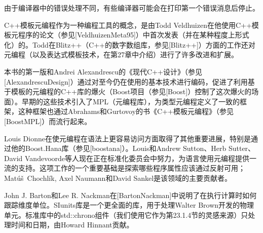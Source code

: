 \begin{notice}
由于编译器中的错误处理不同，有些编译器可能会在打印第一个错误消息后停止。
\end{notice}

C++模板元编程作为一种编程工具的概念，是由Todd Veldhuizen在他使用C++模板元程序的论文（参见[VeldhuizenMeta95]）中首次发表（并在某种程度上形式化）的。Todd在Blitz++（C++的数字数组库，参见[Blitz++]）方面的工作还对元编程（以及表达式模板技术，在第27章中介绍）进行了许多改进和扩展。

本书的第一版和Andrei Alexandrescu的《现代C++设计》（参见[AlexandrescuDesign]）通过对至今仍在使用的基本技术进行编码，促进了利用基于模板的元编程的C++库的爆火（Boost项目（参见[Boost]）控制了这次爆火的场面）。早期的这些技术引入了MPL（元编程库），为类型元编程定义了一致的框架，这种框架也通过Abrahams和Gurtovoy的书《C++模板元编程》（参见[BoostMPL]）而流行起来。

Louis Dionne在使元编程在语法上更容易访问方面取得了其他重要进展，特别是通过他的Boost.Hana库（参见[boostana]）。Louis和Andrew Sutton、Herb Sutter、David Vandevoorde等人现在正在标准化委员会中努力，为语言使用元编程提供一流的支持。这项工作的一个重要基础是探索哪些程序属性应该通过反射可用；Mat\'{u}\v{s}\ Chochl\'{i}k, Axel Naumann和David Sankel是该领域的主要贡献者。

John J. Barton和Lee R. Nackman在[BartonNackman]中说明了在执行计算时如何跟踪维度单位。SIunits库是一个更全面的库，用于处理Walter Brown开发的物理单元。标准库中的std::chrono组件（我们使用它作为第23.1.4节的灵感来源）只处理时间和日期，由Howard Hinnant贡献。































